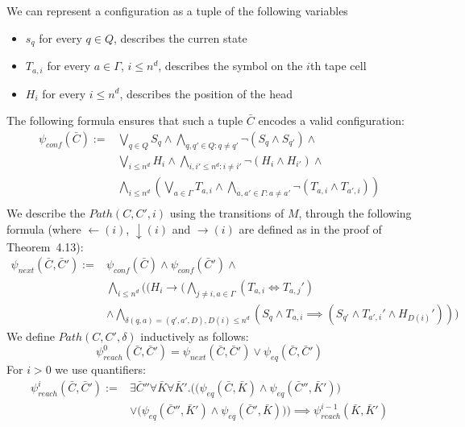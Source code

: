 \documentclass{report}
\begin{document}
We can represent a configuration as a tuple of the following variables
\begin{itemize}
 \item $s_q$ for every $q \in Q$, describes the curren state
 \item $T_{a,i}$ for every $a \in \Gamma$, $i \leq n^d$, describes the symbol on the $i$th tape cell
 \item $H_i$ for every $i \leq n^d$, describes the position of the head
\end{itemize}
The following formula ensures that such a tuple $\bar{C}$ encodes a valid configuration:
\begin{align*}
 \psi_{\mathit{conf}}(\bar{C}) := {}& \bigvee_{q \in Q} S_q \land \bigwedge_{q, q' \in Q\colon q \neq q'} \neg (S_q \land S_{q'}) \land \\
 & \bigvee_{i \leq n^d} H_i \land \bigwedge_{i, i' \leq n^d \colon i \neq i'} \neg (H_i \land H_{i'}) \land \\
 & \bigwedge_{i \leq n^d} \left(\bigvee_{a \in \Gamma} T_{a,i} \land \bigwedge_{a, a' \in \Gamma \colon a \neq a'} \neg ( T_{a,i} \land T_{a', i}) \right)\\
\end{align*}
We describe the $Path(C,C',i)$ using the transitions of $M$, through the following formula (where $\leftarrow(i)$, $\downarrow(i)$ and $\rightarrow(i)$ are defined as in the proof of Theorem~4.13):
\begin{align*}
 \psi_{\mathit{next}}(\bar{C}, \bar{C}') := {}& \psi_{\mathit{conf}}(\bar{C}) \land \psi_{\mathit{conf}}(\bar{C}') \land {} \\
 & \bigwedge_{i \leq n^d} \big( (H_i \to ( \bigwedge_{j \neq i, a \in \Gamma} ( T_{a,i} \iff T_{a,j}' ) \\
 & \land \bigwedge_{\delta(q,a) = (q',a',D), D(i) \leq n^d} ( S_q \land T_{a,i} \implies (S_{q'} \land T_{a',i}' \land H_{D(i)}')) \big)
\end{align*}
We define $Path(C,C',\delta)$ inductively as follows:
\[ \psi^0_{\mathit{reach}}(\bar{C},\bar{C}') = \psi_{\mathit{next}}(\bar{C},\bar{C}') \lor \psi_{\mathit{eq}}(\bar{C},\bar{C}') \]
For $ i > 0$ we use quantifiers:
\begin{align*}
 \psi_{\mathit{reach}}^i(\bar{C},\bar{C}') := & \exists \bar{C}'' \forall \bar{K} \forall \bar{K}'.
  \Big( \big( \psi_{\mathit{eq}}(\bar{C},\bar{K}) \land \psi_{\mathit{eq}}(\bar{C}'',\bar{K}')\big) \\
  & \lor \big( \psi_{\mathit{eq}}(\bar{C}'', \bar{K}') \land \psi_{\mathit{eq}}(\bar{C}',\bar{K})\big)\Big) \implies 
  \psi_{\mathit{reach}}^{i-1}(\bar{K},\bar{K}')
\end{align*}
\end{document}
